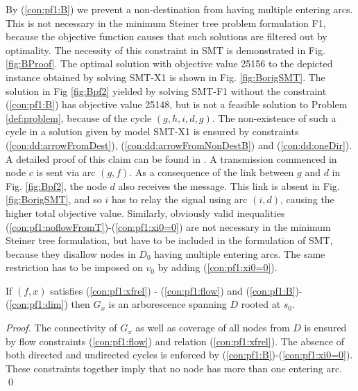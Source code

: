      By (\ref{con:pf1:B}) we prevent a non-destination from having multiple entering arcs. This is not necessary in the minimum Steiner tree problem formulation F1, because the objective function causes that such solutions are filtered out by optimality. The necessity of this constraint in SMT is demonstrated in Fig. \ref{fig:BProof}. The optimal solution with objective value 25156 to the depicted instance obtained by solving SMT-X1 is shown in Fig. \ref{fig:BorigSMT}. The solution in Fig \ref{fig:Bpf2} yielded by solving SMT-F1 without the constraint (\ref{con:pf1:B}) has objective value 25148, but is not a feasible solution to Problem \ref{def:problem}, because of the cycle $(g,h,i,d,g)$. The non-existence of such a cycle in a solution given by model SMT-X1 is ensured by constraints (\ref{con:dd:arrowFromDest}), (\ref{con:dd:arrowFromNonDestB}) and (\ref{con:dd:oneDir}). A detailed proof of this claim can be found in \cite{ivanova16isco}. A transmission commenced in node $c$ is sent via arc $(g,f)$. As a consequence of the link between $g$ and $d$ in Fig. \ref{fig:Bpf2}, the node $d$ also receives the message. This link is absent in Fig. \ref{fig:BorigSMT}, and so $i$ has to relay the signal using arc $(i,d)$, causing the higher total objective value. Similarly, obviously valid inequalities (\ref{con:pf1:noflowFromT})-(\ref{con:pf1:xi0=0}) are not necessary in the minimum Steiner tree formulation, but have to be included in the formulation of SMT, because they  disallow nodes in $D_0$ having multiple entering arcs. The same restriction has to be imposed on $v_0$ by adding (\ref{con:pf1:xi0=0}).
   
\begin{prop}
\label{prop:modelcorrect}
If $(f,x)$ satisfies (\ref{con:pf1:xfrel}) - (\ref{con:pf1:flow}) and (\ref{con:pf1:B})-(\ref{con:pf1:dim}) then $G_{x}$ is an arborescence spanning $D$ rooted at $s_0$.
\end{prop}
 
 \begin{proof}
 The connectivity of $G_{x}$ as well as coverage of all nodes from $D$ is ensured by flow constraints (\ref{con:pf1:flow}) and relation (\ref{con:pf1:xfrel}). The absence of both directed and undirected cycles is enforced by (\ref{con:pf1:B})-(\ref{con:pf1:xi0=0}). These constraints together imply that no node has more than one entering arc. %
 \qed
 \end{proof}
 
